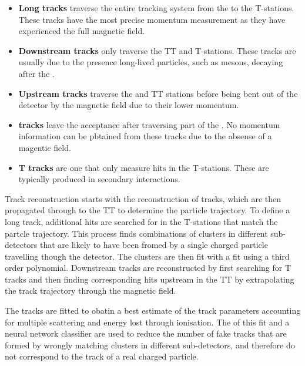 \begin{itemize}
\item \textbf{Long tracks} traverse the entire tracking system from the \velo to the T-stations. These tracks have the most precise momentum measurement as they have experienced the full magnetic field.
\item \textbf{Downstream tracks} only traverse the TT and T-stations. These tracks are usually due to the presence long-lived particles, such as \KS mesons, decaying after the \velo.
\item \textbf{Upstream tracks} traverse the \velo and TT stations before being bent out of the detector by the magnetic field due to their lower momentum.
\item \textbf{\velo tracks} leave the \lhcb acceptance after traversing part of the \velo. No momentum information can be pbtained from these tracks due to the absense of a magentic field.
\item \textbf{T tracks} are one that only measure hits in the T-stations. These are typically produced in secondary interactions.
\end{itemize}

Track reconstruction starts with the reconstruction of \velo tracks, which are then propagated through to the TT to determine the particle trajectory. To define a long track, additional hits are searched for in the T-stations that match the partcle trajectory. This process finds combinations of clusters in different sub-detectors that are likely to have been fromed by a single charged particle travelling though the detector. The clusters are then fit with a \chisq fit using a third order polynomial. Downstream tracks are reconstructed by first searching for T tracks and then finding corresponding hits upstream in the TT by extrapolating the track trajectory through the magnetic field.

The tracks are fitted to obatin a best estimate of the track parameters accounting for multiple scattering and energy lost through ionisation. The \chisq of this fit and a neural network classifier are used to reduce the number of fake tracks that are formed by wrongly matching clusters in different sub-detectors, and therefore do not correspond to the track of a real charged particle.

%

